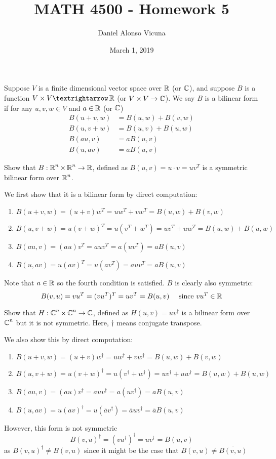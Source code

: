 \documentclass[11pt,onecolumn]{article}
\title{MATH 4500 - Homework 5}
\author{Daniel Alonso Vicuna}
\date{March 1, 2019}
\begin{document}
\maketitle
\begin{definition}
Suppose $V$ is a finite dimensional vector space over $\operatorname{\mathbb{R}}$ (or $\operatorname{\mathbb{C}}$), and suppose $B$ is a function $V \times V → \real$ (or $V \times V \rightarrow \operatorname{\mathbb{C}}$).
We say $B$ is a bilinear form if for any $u, v, w \in V$ and $a \in \operatorname{\mathbb{R}}$ (or $\operatorname{\mathbb{C}}$)
\begin{align}
B(u + v, w) &= B(u, w) + B(v, w) \\
B(u, v + w) &= B(u, v) + B(u, w) \\
B(au, v) &= aB(u, v) \\
B(u, av) &= \overline{a}B(u, v)    
\end{align}
\end{definition}
\begin{exercise}
Show that $B : \operatorname{\mathbb{R}}^n \times \operatorname{\mathbb{R}}^n \rightarrow \operatorname{\mathbb{R}}$, defined as $B(u, v) = u \cdot v = uv^T$ is a symmetric bilinear form over $\operatorname{\mathbb{R}}^n$.
\end{exercise}
\begin{answer}
We first show that it is a bilinear form by direct computation:
\begin{enumerate}
    \item $B(u+v,w) = (u+v)w^T = uw^T + vw^T = B(u,w) + B(v,w)$
    \item $B(u,v+w) = u(v+w)^T = u(v^T+w^T) = uv^T+uw^T = B(u,w) + B(u,w)$
    \item $B(au,v) = (au)v^T = auv^T = a(uv^T) = aB(u,v)$
    \item $B(u,av) = u(av)^T = u(av^T) = auv^T = aB(u,v)$
\end{enumerate}
Note that $a\in \operatorname{\mathbb{R}}$ so the fourth condition is satisfied. $B$ is clearly also symmetric:
$$ B(v,u) = vu^T = (vu^T)^T = uv^T = B(u,v) \quad \text{ since } vu^T \in \operatorname{\mathbb{R}}$$
\end{answer}
\begin{exercise}
Show that $H : \operatorname{\mathbb{C}}^n \times \operatorname{\mathbb{C}}^n \rightarrow \operatorname{\mathbb{C}}$, defined as $H(u, v) = uv^\dagger$ is a bilinear form over $\operatorname{\mathbb{C}}^n$ but it is not symmetric. Here, $\dagger$ means conjugate transpose.
\end{exercise}
\begin{answer}
We also show this by direct computation:
\begin{enumerate}
    \item $B(u+v,w) = (u+v)w^\dagger = uw^\dagger + vw^\dagger = B(u,w) + B(v,w)$
    \item $B(u,v+w) = u(v+w)^\dagger = u(v^\dagger+w^\dagger) = uv^\dagger+uw^\dagger = B(u,w) + B(u,w)$
    \item $B(au,v) = (au)v^\dagger = auv^\dagger = a(uv^\dagger) = aB(u,v)$
    \item $B(u,av) = u(av)^\dagger = u(\overline{a}v^\dagger) = \overline{a}uv^\dagger = \overline{a}B(u,v)$
\end{enumerate}
However, this form is not symmetric
$$B(v,u)^\dagger = (vu^\dagger)^\dagger = uv^\dagger = B(u,v)$$
as $B(v,u)^\dagger \neq B(v,u)$ since it might be the case that $B(v,u) \neq \overline{B(v,u)}$
\end{answer}
\end{document}
